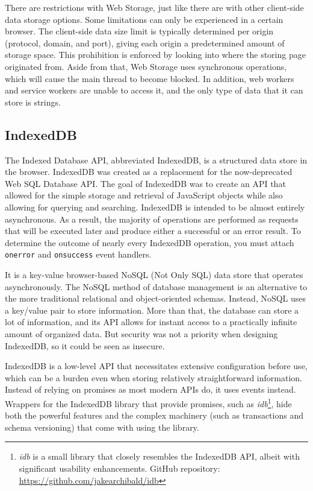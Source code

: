 There are restrictions with Web Storage, just like there are with other client-side data storage options. Some limitations can only be experienced in a certain browser. The client-side data size limit is typically determined per origin (protocol, domain, and port), giving each origin a predetermined amount of storage space. This prohibition is enforced by looking into where the storing page originated from. Aside from that, Web Storage uses synchronous operations, which will cause the main thread to become blocked. In addition, web workers and service workers are unable to access it, and the only type of data that it can store is strings.

\subsection*{IndexedDB}
The Indexed Database API, abbreviated IndexedDB, is a structured data store in the browser. IndexedDB was created as a replacement for the now-deprecated Web SQL Database API. The goal of IndexedDB was to create an API that allowed for the simple storage and retrieval of JavaScript objects while also allowing for querying and searching. IndexedDB is intended to be almost entirely asynchronous. As a result, the majority of operations are performed as requests that will be executed later and produce either a successful or an error result. To determine the outcome of nearly every IndexedDB operation, you must attach \texttt{onerror} and \texttt{onsuccess} event handlers.

It is a key-value browser-based NoSQL (Not Only SQL) data store that operates asynchronously. The NoSQL method of database management is an alternative to the more traditional relational and object-oriented schemas. Instead, NoSQL uses a key/value pair to store information. More than that, the database can store a lot of information, and its API allows for instant access to a practically infinite amount of organized data. But security was not a priority when designing IndexedDB, so it could be seen as insecure.

IndexedDB is a low-level API that necessitates extensive configuration before use, which can be a burden even when storing relatively straightforward information. Instead of relying on promises as most modern APIs do, it uses events instead. Wrappers for the IndexedDB library that provide promises, such as \emph{idb}\footnote{\emph{idb} is a small library that closely resembles the IndexedDB API, albeit with significant usability enhancements. GitHub repository: \url{https://github.com/jakearchibald/idb}}, hide both the powerful features and the complex machinery (such as transactions and schema versioning) that come with using the library.

